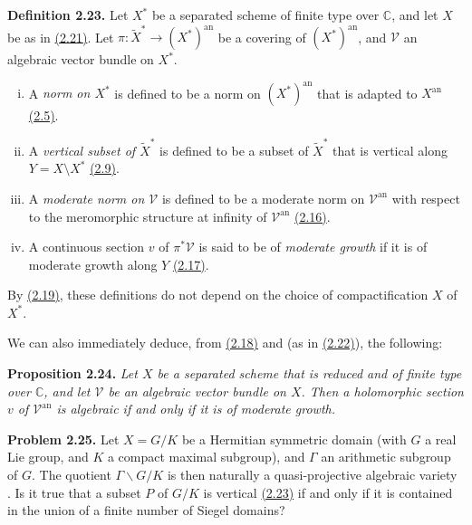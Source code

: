 \documentclass{report}
\newenvironment{itenv}[1]
  {\phantomsection\par\medskip\noindent\textbf{#1.}\itshape}
  {\par\medskip}
\newenvironment{rmenv}[1]
  {\phantomsection\par\medskip\noindent\textbf{#1.}\rmfamily}
  {\par\medskip}
\renewcommand{\cal}[1]{{\mathcal{#1}}}
\newcommand{\CC}{\mathbb{C}}
\newcommand{\an}{\mathrm{an}}
\newcommand{\oldpage}[1]{\marginpar{\footnotesize$\Big\vert$ \textit{p.~#1}}}
\begin{document}
\begin{rmenv}{Definition 2.23}
\label{II.2.23}
  Let $X^*$ be a separated scheme of finite type over $\CC$, and let $X$ be as in \hyperref[II.2.21]{(2.21)}.
  Let $\pi\colon\widetilde{X}^*\to(X^*)^\an$ be a covering of $(X^*)^\an$, and $\cal{V}$ an
\oldpage{71}
  algebraic vector bundle on $X^*$.
  \begin{enumerate}[(i)]
    \item A \emph{norm on $X^*$} is defined to be a norm on $(X^*)^\an$ that is adapted to $X^\an$ \hyperref[II.2.5]{(2.5)}.
    \item A \emph{vertical subset of $\widetilde{X}^*$} is defined to be a subset of $\widetilde{X}^*$ that is vertical along $Y=X\setminus X^*$ \hyperref[II.2.9]{(2.9)}.
    \item A \emph{moderate norm on $\cal{V}$} is defined to be a moderate norm on $\cal{V}^\an$ with respect to the meromorphic structure at infinity of $\cal{V}^\an$ \hyperref[II.2.16]{(2.16)}.
    \item A continuous section $v$ of $\pi^*\cal{V}$ is said to be of \emph{moderate growth} if it is of moderate growth along $Y$ \hyperref[II.2.17]{(2.17)}.
  \end{enumerate}
\end{rmenv}

By \hyperref[II.2.19]{(2.19)}, these definitions do not depend on the choice of compactification $X$ of $X^*$.

We can also immediately deduce, from \hyperref[II.2.18]{(2.18)} and \cite{GAGA} (as in \hyperref[II.2.22]{(2.22)}), the following:

\begin{itenv}{Proposition 2.24}
\label{II.2.24}
  Let $X$ be a separated scheme that is reduced and of finite type over $\CC$, and let $\cal{V}$ be an algebraic vector bundle on $X$.
  Then a holomorphic section $v$ of $\cal{V}^\an$ is algebraic if and only if it is of moderate growth.
\end{itenv}

\begin{rmenv}{Problem 2.25}
\label{II.2.25}
  Let $X=G/K$ be a Hermitian symmetric domain (with $G$ a real Lie group, and $K$ a compact maximal subgroup), and $\Gamma$ an arithmetic subgroup of $G$.
  The quotient $\Gamma\backslash G/K$ is then naturally a quasi-projective algebraic variety \cite{2}.
  Is it true that a subset $P$ of $G/K$ is vertical \hyperref[II.2.23]{(2.23)} if and only if it is contained in the union of a finite number of Siegel domains?
\end{rmenv}
\end{document}
